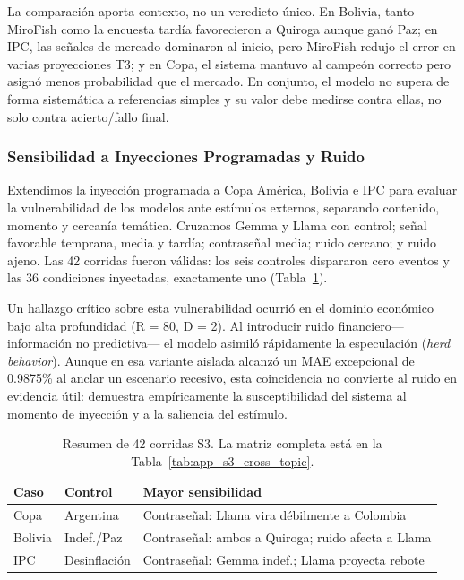\documentclass[11pt]{article}
\begin{document}
La comparación aporta contexto, no un veredicto único. En Bolivia, tanto MiroFish como la encuesta tardía favorecieron a Quiroga aunque ganó Paz; en IPC, las señales de mercado dominaron al inicio, pero MiroFish redujo el error en varias proyecciones T3; y en Copa, el sistema mantuvo al campeón correcto pero asignó menos probabilidad que el mercado. En conjunto, el modelo no supera de forma sistemática a referencias simples y su valor debe medirse contra ellas, no solo contra acierto/fallo final.

\subsubsection{Sensibilidad a Inyecciones Programadas y Ruido}

Extendimos la inyección programada a Copa América, Bolivia e IPC para evaluar la vulnerabilidad de los modelos ante estímulos externos, separando contenido, momento y cercanía temática. Cruzamos Gemma y Llama con control; señal favorable temprana, media y tardía; contraseñal media; ruido cercano; y ruido ajeno. Las 42 corridas fueron válidas: los seis controles dispararon cero eventos y las 36 condiciones inyectadas, exactamente uno (Tabla~\ref{tab:s3_cross_topic}).

Un hallazgo crítico sobre esta vulnerabilidad ocurrió en el dominio económico bajo alta profundidad (R = 80, D = 2). Al introducir ruido financiero—información no predictiva— el modelo asimiló rápidamente la especulación (\textit{herd behavior}). Aunque en esa variante aislada alcanzó un MAE excepcional de 0.9875\% al anclar un escenario recesivo, esta coincidencia no convierte al ruido en evidencia útil: demuestra empíricamente la susceptibilidad del sistema al momento de inyección y a la saliencia del estímulo.
\begin{table}[H]
\centering
\scriptsize
\begin{tabular}{@{}lp{2.0cm}p{3.5cm}@{}}
\toprule
\textbf{Caso} & \textbf{Control} & \textbf{Mayor sensibilidad} \\
\midrule
Copa & Argentina & Contraseñal: Llama vira débilmente a Colombia \\
Bolivia & Indef./Paz & Contraseñal: ambos a Quiroga; ruido afecta a Llama \\
IPC & Desinflación & Contraseñal: Gemma indef.; Llama proyecta rebote \\
\bottomrule
\end{tabular}
\caption{Resumen de 42 corridas S3. La matriz completa está en la Tabla~\ref{tab:app_s3_cross_topic}.}
\label{tab:s3_cross_topic}
\end{table}
\end{document}
